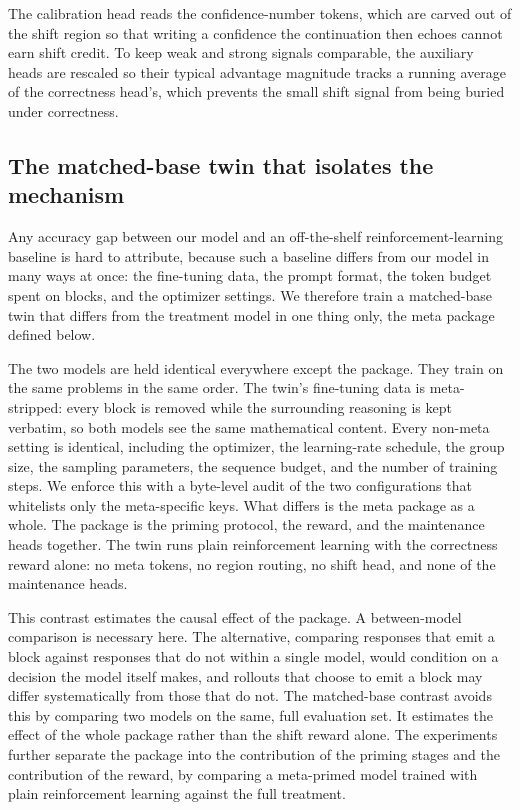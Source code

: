 The calibration head reads the confidence-number tokens, which are carved out of
the shift region so that writing a confidence the continuation then echoes cannot
earn shift credit. To keep weak and strong signals comparable, the auxiliary
heads are rescaled so their typical advantage magnitude tracks a running average
of the correctness head's, which prevents the small shift signal from being
buried under correctness.

\subsection{The matched-base twin that isolates the mechanism}
\label{sec:method:twin}

Any accuracy gap between our model and an off-the-shelf reinforcement-learning
baseline is hard to attribute, because such a baseline differs from our model in
many ways at once: the fine-tuning data, the prompt format, the token budget
spent on blocks, and the optimizer settings. We therefore train a matched-base
twin that differs from the treatment model in one thing only, the meta package
defined below.

The two models are held identical everywhere except the package. They train on
the same problems in the same order. The twin's fine-tuning data is
meta-stripped: every block is removed while the surrounding reasoning is kept
verbatim, so both models see the same mathematical content. Every non-meta
setting is identical, including the optimizer, the learning-rate schedule, the
group size, the sampling parameters, the sequence budget, and the number of
training steps. We enforce this with a byte-level audit of the two configurations
that whitelists only the meta-specific keys. What differs is the meta package as
a whole. The package is the priming protocol, the \pmishift{} reward, and the
maintenance heads together. The twin runs plain reinforcement learning with the
correctness reward alone: no meta tokens, no region routing, no shift head, and
none of the maintenance heads.

This contrast estimates the causal effect of the package. A between-model
comparison is necessary here. The alternative, comparing responses that emit a
block against responses that do not within a single model, would condition on a
decision the model itself makes, and rollouts that choose to emit a block may
differ systematically from those that do not. The matched-base contrast avoids
this by comparing two models on the same, full evaluation set. It estimates the
effect of the whole package rather than the shift reward alone. The experiments
further separate the package into the contribution of the priming stages and the
contribution of the reward, by comparing a meta-primed model trained with plain
reinforcement learning against the full treatment.
